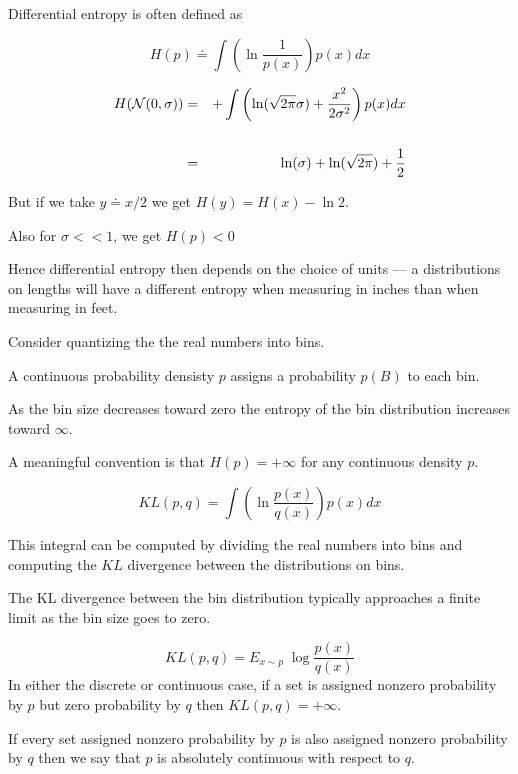 {\vfill
Differential entropy is often defined as

\vfill
$$H(p) \doteq \int \left(\ln \frac{1}{p(x)}\right) p(x) dx$$


\begin{eqnarray*}
  H({\cal N}(0,\sigma)) & = &  + \int \left( \ln(\sqrt{2\pi} \sigma) + \frac{x^2}{2\sigma^2}\right) p(x) dx \\
  \\
  & = & \ln(\sigma) + \ln(\sqrt{2\pi}) + \frac{1}{2}
\end{eqnarray*}

\vfill
But if we take $y \doteq x/2$ we get $H(y) = H(x) - \ln 2$.

\vfill
Also for $\sigma << 1$, we get $H(p) < 0$

\vfill
Hence differential entropy then depends on the choice of units --- a distributions on lengths will have a different entropy
when measuring in inches than when measuring in feet.


Consider quantizing the the real numbers into bins.

\vfill
A continuous probability densisty $p$ assigns a probability $p(B)$ to each bin.

\vfill
As the bin size decreases toward zero the entropy of the bin distribution increases toward $\infty$.

\vfill
A meaningful convention is that $H(p) = +\infty$ for any continuous density $p$.


$$KL(p,q) = \int \left( \ln \frac{p(x)}{q(x)}\right) p(x) dx$$

\vfill
This integral can be computed by dividing the real numbers into bins and computing the $KL$ divergence between the distributions on bins.

\vfill
The KL divergence between the bin distribution typically approaches a finite limit as the bin size goes to zero.


$$KL(p,q) = E_{x \sim p}\; \log\frac{p(x)}{q(x)}$$
\vfill
In either the discrete or continuous case, if a set is assigned nonzero probability by $p$ but zero probability by $q$ then $KL(p,q) = +\infty$.

\vfill
If every set assigned nonzero probability by $p$ is also assigned nonzero probability by $q$ then we say that $p$ is absolutely continuous with respect to $q$.

}
